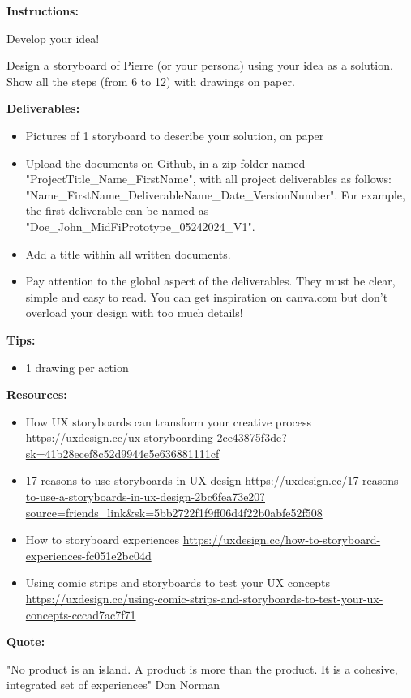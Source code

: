 \makeheaderfiles

\textbf{Instructions:}

Develop your idea!

Design a storyboard of Pierre (or your persona) using your idea as a solution. Show all the steps (from 6 to 12) with drawings on paper.

\textbf{Deliverables:}

\begin{itemize}
\item Pictures of 1 storyboard to describe your solution, on paper
\item Upload the documents on Github, in a zip folder named "ProjectTitle\_Name\_FirstName", with all project deliverables as follows: "Name\_FirstName\_DeliverableName\_Date\_VersionNumber".  For example, the first deliverable can be named as "Doe\_John\_MidFiPrototype\_05242024\_V1".
\item Add a title within all written documents.
\item Pay attention to the global aspect of the deliverables. They must be clear, simple and easy to read. You can get inspiration on canva.com but don't overload your design with too much details!
\end{itemize}

\textbf{Tips:}

\begin{itemize}
\item 1 drawing per action
\end{itemize}

\textbf{Resources:}

\begin{itemize}
\item How UX storyboards can transform your creative process \url{https://uxdesign.cc/ux-storyboarding-2ce43875f3de?sk=41b28ecef8c52d9944e5e636881111cf}
\item 17 reasons to use storyboards in UX design \url{https://uxdesign.cc/17-reasons-to-use-a-storyboards-in-ux-design-2bc6fea73e20?source=friends_link&sk=5bb2722f1f9ff06d4f22b0abfe52f508}
\item How to storyboard experiences \url{https://uxdesign.cc/how-to-storyboard-experiences-fc051e2bc04d}
\item Using comic strips and storyboards to test your UX concepts \url{https://uxdesign.cc/using-comic-strips-and-storyboards-to-test-your-ux-concepts-cccad7ac7f71}
\end{itemize}

\textbf{Quote:}

"No product is an island. A product is more than the product. It is a cohesive, integrated set of experiences" Don Norman

